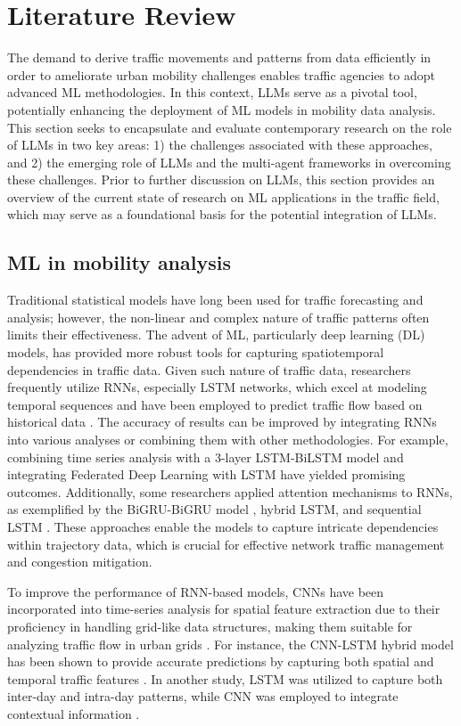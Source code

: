 \section{Literature Review}
The demand to derive traffic movements and patterns from data efficiently in order to ameliorate urban mobility challenges enables traffic agencies to adopt advanced ML methodologies. In this context, LLMs serve as a pivotal tool, potentially enhancing the deployment of ML models in mobility data analysis. This section seeks to encapsulate and evaluate contemporary research on the role of LLMs in two key areas: 1) the challenges associated with these approaches, and 2) the emerging role of LLMs and the multi-agent frameworks in overcoming these challenges. Prior to further discussion on LLMs, this section provides an overview of the current state of research on ML applications in the traffic field, which may serve as a foundational basis for the potential integration of LLMs.

\subsection{ML in mobility analysis}

Traditional statistical models have long been used for traffic forecasting and analysis; however, the non-linear and complex nature of traffic patterns often limits their effectiveness. The advent of ML, particularly deep learning (DL) models, has provided more robust tools for capturing spatiotemporal dependencies in traffic data. Given such nature of traffic data, researchers frequently utilize RNNs, especially LSTM networks, which excel at modeling temporal sequences and have been employed to predict traffic flow based on historical data \cite{ma2015long, fu2016using, yu2017spatiotemporal}. The accuracy of results can be improved by integrating RNNs into various analyses or combining them with other methodologies. For example, combining time series analysis with a 3-layer LSTM-BiLSTM model \cite{ma2021short} and integrating Federated Deep Learning with LSTM \cite{yuan2022fedstn} have yielded promising outcomes. Additionally, some researchers applied attention mechanisms to RNNs, as exemplified by the BiGRU-BiGRU model \cite{chauhan2024novel}, hybrid LSTM, and sequential LSTM \cite{sun2021joint}. These approaches enable the models to capture intricate dependencies within trajectory data, which is crucial for effective network traffic management and congestion mitigation.

To improve the performance of RNN-based models, CNNs have been incorporated into time-series analysis for spatial feature extraction due to their proficiency in handling grid-like data structures, making them suitable for analyzing traffic flow in urban grids \cite{lv2014traffic, zhang2021short}. For instance, the CNN-LSTM hybrid model has been shown to provide accurate predictions by capturing both spatial and temporal traffic features \cite{bogaerts2020graph, zheng2020hybrid}. In another study, LSTM was utilized to capture both inter-day and intra-day patterns, while CNN was employed to integrate contextual information \cite{ma2020daily}.

